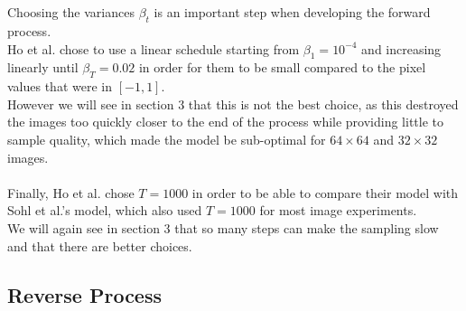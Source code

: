 \documentclass{article}
\begin{document}
\\\\
Choosing the variances $\beta_t$ is an important step when developing the forward process. \\
Ho et al. \cite{ho2020denoising} chose to use a linear schedule starting from $\beta_1 = 10^{-4}$ and increasing linearly until $\beta_T = 0.02$ in order for them to be small compared to the pixel values that were in $[-1, 1]$. \cite{ho2020denoising} \\
However we will see in section 3 that this is not the best choice, as this destroyed the images too quickly closer to the end of the process while providing little to sample quality, which made the model be sub-optimal for $64 \times 64$ and $32 \times 32$ images. \cite{nichol2021improved}
\\\\
Finally, Ho et al. \cite{ho2020denoising} chose $T = 1000$ in order to be able to compare their model with Sohl et al.'s \cite{sohldickstein2015deep} model, which also used $T = 1000$ for most image experiments. \\
We will again see in section 3 that so many steps can make the sampling slow and that there are better choices. \cite{nichol2021improved}
\subsection{Reverse Process}
\end{document}
